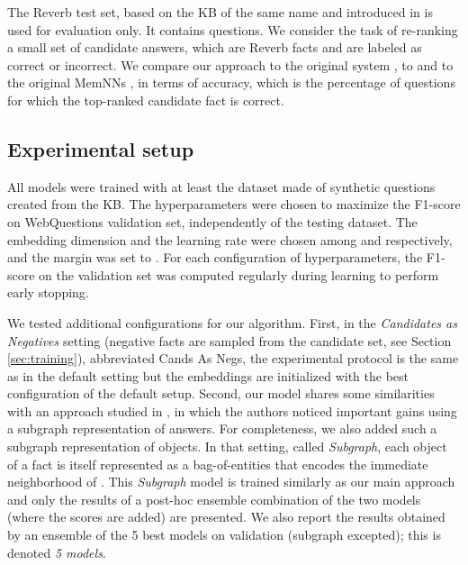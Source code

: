 \documentclass[11pt,a4paper]{article}
\newcommand{\wq}{{\sf WebQuestions}\xspace}
\newcommand{\rv}{{\sf Reverb}\xspace}
\begin{document}
The \rv test set, based on the KB of the same name and introduced in
\cite{paralex} is used for evaluation only. It contains 
questions. We consider the task of re-ranking a small set of candidate
answers, which are \rv facts and are labeled as correct or
incorrect. We compare our approach to the original system
\cite{paralex}, to \cite{bordes2014open} and to the original MemNNs
\cite{weston2014memory}, in terms of accuracy, which is the percentage
of questions for which the top-ranked candidate fact is correct.


\subsection{Experimental setup}
All models were trained with at least the dataset made of
synthetic questions created from the KB.
The hyperparameters were chosen to maximize the F1-score on \wq
validation set, independently of the testing dataset. The
embedding dimension and the learning rate were chosen among
 and  respectively, and the
margin  was set to .
For each configuration of
hyperparameters, the F1-score on the validation set was computed
regularly during learning to perform early stopping.

We tested additional configurations for our algorithm. First, in the
{\it Candidates as Negatives} setting (negative facts are sampled from
the candidate set, see Section \ref{sec:training}), abbreviated {\sc
  Cands As Negs}, the experimental protocol is the same as in the
default setting but the embeddings are initialized with the best
configuration of the default setup. Second, our model shares some
similarities with an approach studied in
\cite{bordes-chopra-weston:2014:EMNLP2014}, in which the authors
noticed important gains using a subgraph representation of
answers. For completeness, we also added such a subgraph
representation of objects. In that setting, called {\it Subgraph},
each object  of a fact is itself represented as a
bag-of-entities that encodes the immediate neighborhood of
. This {\it Subgraph} model is trained similarly as our main
approach and only the results of a post-hoc ensemble combination of the two
models (where the scores are added) are presented.
We also report the results obtained by an ensemble of the 5 best models
on validation (subgraph excepted); this is denoted {\it 5 models}.
\end{document}
